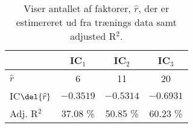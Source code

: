 \begin{table}[h]
\center
\begin{tabular}{lccc}
\toprule
& IC$_1$ & IC$_2$ & IC$_3$ \\ \midrule
$\widehat{r}$ & 6 & 11 & 20 \\ 
IC$\del{\widehat{r}}$ & $-0.3519$  & $-0.5314$ & $-0.6931$  \\
Adj. R$^2$ & 37.08 \% & 50.85 \% & 60.23 \% \\ \bottomrule
 \end{tabular}
\caption{Viser antallet af faktorer, $\widehat{r}$, der er estimereret ud fra trænings data samt adjusted R$^2$.  } \label{tab:est_faktor}
\end{table}